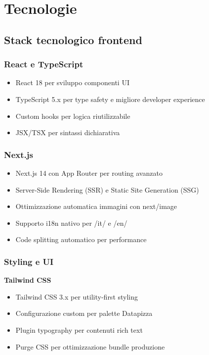 \chapter{Tecnologie}

\section{Stack tecnologico frontend}
\subsection{React e TypeScript}
\begin{itemize}
  \item React 18 per sviluppo componenti UI
  \item TypeScript 5.x per type safety e migliore developer experience
  \item Custom hooks per logica riutilizzabile
  \item JSX/TSX per sintassi dichiarativa
\end{itemize}

\subsection{Next.js}
\begin{itemize}
  \item Next.js 14 con App Router per routing avanzato
  \item Server-Side Rendering (SSR) e Static Site Generation (SSG)
  \item Ottimizzazione automatica immagini con next/image
  \item Supporto i18n nativo per /it/ e /en/
  \item Code splitting automatico per performance
\end{itemize}

\subsection{Styling e UI}
\textbf{Tailwind CSS}
\begin{itemize}
  \item Tailwind CSS 3.x per utility-first styling
  \item Configurazione custom per palette Datapizza
  \item Plugin typography per contenuti rich text
  \item Purge CSS per ottimizzazione bundle produzione
\end{itemize}

